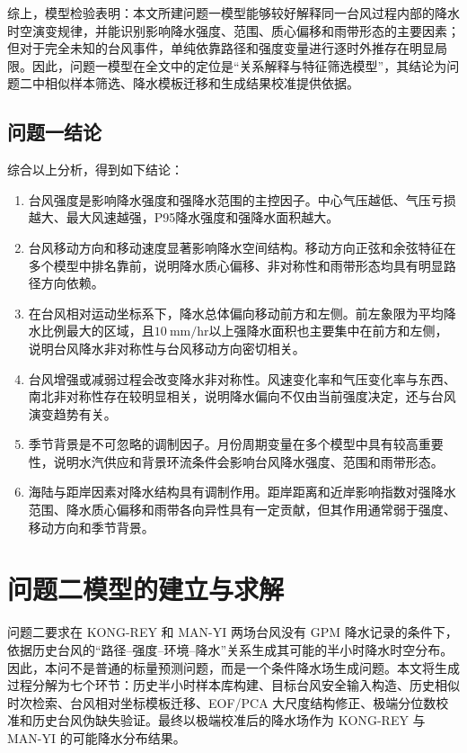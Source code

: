 \documentclass[UTF8,a4paper,zihao=5]{ctexart}
\numberwithin{equation}{section}
\numberwithin{figure}{section}
\numberwithin{table}{section}
\begin{document}
综上，模型检验表明：本文所建问题一模型能够较好解释同一台风过程内部的降水时空演变规律，并能识别影响降水强度、范围、质心偏移和雨带形态的主要因素；但对于完全未知的台风事件，单纯依靠路径和强度变量进行逐时外推存在明显局限。因此，问题一模型在全文中的定位是“关系解释与特征筛选模型”，其结论为问题二中相似样本筛选、降水模板迁移和生成结果校准提供依据。


\subsection{问题一结论}

综合以上分析，得到如下结论：

\begin{enumerate}
    \item 台风强度是影响降水强度和强降水范围的主控因子。中心气压越低、气压亏损越大、最大风速越强，P95降水强度和强降水面积越大。
    \item 台风移动方向和移动速度显著影响降水空间结构。移动方向正弦和余弦特征在多个模型中排名靠前，说明降水质心偏移、非对称性和雨带形态均具有明显路径方向依赖。
    \item 在台风相对运动坐标系下，降水总体偏向移动前方和左侧。前左象限为平均降水比例最大的区域，且$10\ \mathrm{mm/hr}$以上强降水面积也主要集中在前方和左侧，说明台风降水非对称性与台风移动方向密切相关。
    \item 台风增强或减弱过程会改变降水非对称性。风速变化率和气压变化率与东西、南北非对称性存在较明显相关，说明降水偏向不仅由当前强度决定，还与台风演变趋势有关。
    \item 季节背景是不可忽略的调制因子。月份周期变量在多个模型中具有较高重要性，说明水汽供应和背景环流条件会影响台风降水强度、范围和雨带形态。
    \item 海陆与距岸因素对降水结构具有调制作用。距岸距离和近岸影响指数对强降水范围、降水质心偏移和雨带各向异性具有一定贡献，但其作用通常弱于强度、移动方向和季节背景。
\end{enumerate}

\section{问题二模型的建立与求解}

问题二要求在 KONG-REY 和 MAN-YI 两场台风没有 GPM 降水记录的条件下，依据历史台风的“路径--强度--环境--降水”关系生成其可能的半小时降水时空分布。因此，本问不是普通的标量预测问题，而是一个条件降水场生成问题。本文将生成过程分解为七个环节：历史半小时样本库构建、目标台风安全输入构造、历史相似时次检索、台风相对坐标模板迁移、EOF/PCA 大尺度结构修正、极端分位数校准和历史台风伪缺失验证。最终以极端校准后的降水场作为 KONG-REY 与 MAN-YI 的可能降水分布结果。
\end{document}
